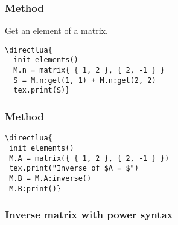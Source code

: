 \subsubsection{Method  } %
\label{ssub:get_an_element_of_a_matrix}
Get an element of a matrix.


\begin{minipage}{.5\textwidth}
\begin{verbatim}
\directlua{
  init_elements()
  M.n = matrix{ { 1, 2 }, { 2, -1 } }
  S = M.n:get(1, 1) + M.n:get(2, 2)
  tex.print(S)}
\end{verbatim}
\end{minipage}
\begin{minipage}{.5\textwidth}
\end{minipage}


\subsubsection{Method  } %
\label{ssub:inverse_matrix}

\begin{minipage}{.6\textwidth}
\begin{verbatim}
\directlua{
 init_elements()
 M.A = matrix({ { 1, 2 }, { 2, -1 } })
 tex.print("Inverse of $A = $")
 M.B = M.A:inverse()
 M.B:print()}
\end{verbatim}
\end{minipage}
\begin{minipage}{.4\textwidth}
\end{minipage}

\subsubsection{Inverse matrix with power syntax} %
\label{ssub:inverse_matrix_with_power_syntax}


